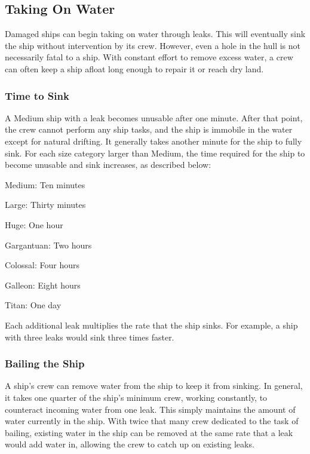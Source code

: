   \subsection{Taking On Water}\label{Taking On Water}
    Damaged ships can begin taking on water through leaks.
    This will eventually sink the ship without intervention by its crew.
    However, even a hole in the hull is not necessarily fatal to a ship.
    With constant effort to remove excess water, a crew can often keep a ship afloat long enough to repair it or reach dry land.

    \subsubsection{Time to Sink}
      A Medium ship with a leak becomes unusable after one minute.
      After that point, the crew cannot perform any ship tasks, and the ship is immobile in the water except for natural drifting.
      It generally takes another minute for the ship to fully sink.
      For each size category larger than Medium, the time required for the ship to become unusable and sink increases, as described below:
      \begin{raggeditemize}
        \item Medium: Ten minutes
        \item Large: Thirty minutes
        \item Huge: One hour
        \item Gargantuan: Two hours
        \item Colossal: Four hours
        \item Galleon: Eight hours
        \item Titan: One day
      \end{raggeditemize}

      Each additional leak multiplies the rate that the ship sinks.
      For example, a ship with three leaks would sink three times faster.

    \subsubsection{Bailing the Ship}
      A ship's crew can remove water from the ship to keep it from sinking.
      In general, it takes one quarter of the ship's minimum crew, working constantly, to counteract incoming water from one leak.
      This simply maintains the amount of water currently in the ship.
      With twice that many crew dedicated to the task of bailing, existing water in the ship can be removed at the same rate that a leak would add water in, allowing the crew to catch up on existing leaks.

